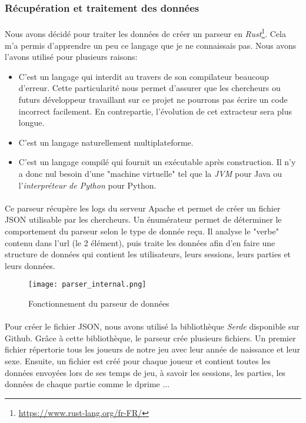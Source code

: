 \subsubsection{Récupération et traitement des données}

\paragraph{}Nous avons décidé pour traiter les données de créer un parseur en \emph{Rust}\footnote{\url{https://www.rust-lang.org/fr-FR/}}. Cela m'a permis d'apprendre un peu ce
langage que je ne connaissais pas. Nous avons l'avons utilisé pour plusieurs raisons:
\begin{itemize}
    \item C'est un langage qui interdit au travers de son compilateur beaucoup d'erreur. Cette particularité nous permet d'assurer que les chercheurs ou futurs 
    développeur travaillant sur ce projet ne pourrons pas écrire un code incorrect facilement. En contrepartie, l'évolution de cet extracteur sera plus longue.
    \item C'est un langage naturellement multiplateforme.
    \item C'est un langage compilé qui fournit un exécutable après construction. Il n'y a donc nul besoin d'une "machine virtuelle" tel que la \emph{JVM} pour 
    Java ou l'\emph{interpréteur de Python} pour Python.
\end{itemize}


\paragraph{}Ce parseur récupère les logs du serveur Apache et permet de créer un fichier JSON utilisable par les chercheurs. Un énumérateur permet de déterminer le comportement du
parseur selon le type de donnée reçu. Il analyse le "verbe" contenu dans l'url (le 2 élément), puis traite les données afin d'en faire une structure de données qui contient
les utilisateurs, leurs sessions, leurs parties et leurs données.

\begin{figure}[H]
    \begin{center}
    \texttt{[image: parser\_internal.png]}
    \end{center}
    \caption{Fonctionnement du parseur de données}
\label{DataParser}
\end{figure}

\paragraph{}Pour créer le fichier JSON, nous avons utilisé la bibliothèque \emph{Serde}\cite{JSONRUST} disponible sur Github. Grâce à cette bibliothèque, le parseur crée plusieurs
fichiers. Un premier fichier répertorie tous les joueurs de notre jeu avec leur année de naissance et leur sexe. Ensuite, un fichier est créé pour chaque joueur et contient toutes
les données envoyées lors de ses temps de jeu, à savoir les sessions, les parties, les données de chaque partie comme le dprime ...